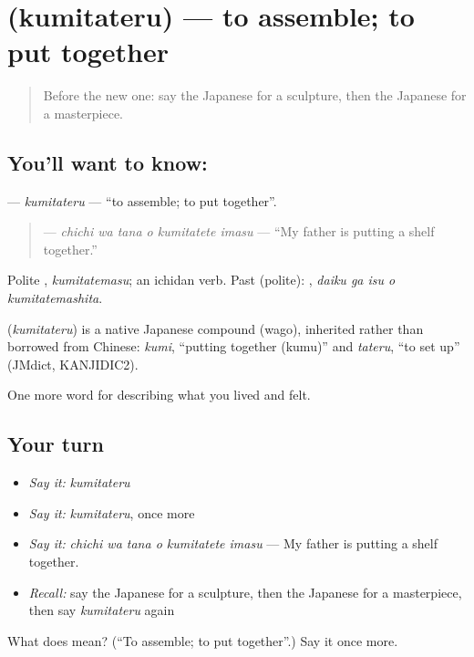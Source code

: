 \section[\texorpdfstring{\ja{くみたてる} (kumitateru)}{くみたてる (kumitateru)}]{ (kumitateru) — to assemble; to put together}

\label{lesson:JA-C468-kumitateru}



\begin{quote}
Before the new one: say the Japanese for a sculpture, then the Japanese for a masterpiece.
\end{quote}

\subsection*{You'll want to know: }
\textbf{} — \emph{kumitateru} — \textquotedblleft{}to assemble; to put together\textquotedblright{}.

\begin{quote}
\textbf{  } — \emph{chichi wa tana o kumitatete imasu} — \textquotedblleft{}My father is putting a shelf together.\textquotedblright{}
\end{quote}

Polite \textbf{}, \emph{kumitatemasu}; an ichidan verb. Past (polite): \textbf{  }, \emph{daiku ga isu o kumitatemashita}.

\begin{cousinweb}
\textbf{} (\emph{kumitateru}) is a native Japanese compound (wago), inherited rather than borrowed from Chinese: \emph{kumi}, \textquotedblleft{}putting together (kumu)\textquotedblright{} and \emph{tateru}, \textquotedblleft{}to set up\textquotedblright{} (JMdict, KANJIDIC2).
\end{cousinweb}

\begin{grammarlens}[title={What you've built}]
One more word for describing what you lived and felt.
\end{grammarlens}

\subsection*{Your turn}
\begin{itemize}
\raggedright
  \item \emph{Say it:} \emph{kumitateru}
  \item \emph{Say it:} \emph{kumitateru}, once more
  \item \emph{Say it:} \emph{chichi wa tana o kumitatete imasu} — My father is putting a shelf together.
  \item \emph{Recall:} say the Japanese for a sculpture, then the Japanese for a masterpiece, then say \emph{kumitateru} again
\end{itemize}

\begin{tcolorbox}[breakable,colback=teal!4,colframe=teal!35!black,title={Before you move on}]
What does  mean? (\textquotedblleft{}To assemble; to put together\textquotedblright{}.) Say it once more.
\end{tcolorbox}
